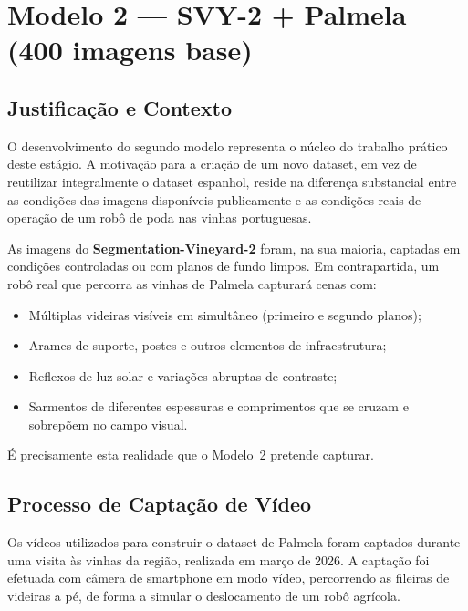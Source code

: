 \section{Modelo 2 — SVY-2 + Palmela (400 imagens base)}
\label{sec:modelo2}

\subsection{Justificação e Contexto}

O desenvolvimento do segundo modelo representa o núcleo do trabalho prático
deste estágio. A motivação para a criação de um novo dataset, em vez de
reutilizar integralmente o dataset espanhol, reside na diferença substancial
entre as condições das imagens disponíveis publicamente e as condições reais
de operação de um robô de poda nas vinhas portuguesas.

As imagens do \textbf{Segmentation-Vineyard-2} foram, na sua maioria, captadas em condições
controladas ou com planos de fundo limpos. Em contrapartida, um robô real
que percorra as vinhas de Palmela capturará cenas com:

\begin{itemize}
  \item Múltiplas videiras visíveis em simultâneo (primeiro e segundo planos);
  \item Arames de suporte, postes e outros elementos de infraestrutura;
  \item Reflexos de luz solar e variações abruptas de contraste;
  \item Sarmentos de diferentes espessuras e comprimentos que se cruzam
    e sobrepõem no campo visual.
\end{itemize}

É precisamente esta realidade que o Modelo~2 pretende capturar.

\subsection{Processo de Captação de Vídeo}

Os vídeos utilizados para construir o dataset de Palmela foram captados
durante uma visita às vinhas da região, realizada em março de 2026. A
captação foi efetuada com câmera de smartphone em modo vídeo, percorrendo
as fileiras de videiras a pé, de forma a simular o deslocamento de um
robô agrícola.

